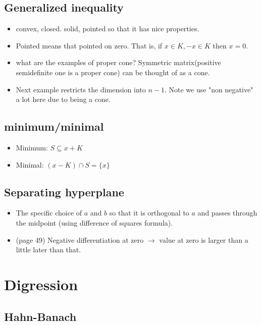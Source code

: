 \documentclass{article}
\theoremstyle{remark}
\begin{document}
\subsection*{Generalized inequality}
\begin{itemize}
\item convex, closed. solid, pointed so that it has nice properties.
    \item Pointed means that pointed on zero. That is, if $x\in K,-x\in K$ then $x=0$. 
    \item what are the examples of proper cone?
    Symmetric matrix(positive semidefinite one is a proper cone) can be thought of as a cone.
    \item Next example restricts the dimension into $n-1$. Note we use "non negative" a lot here due to being a cone.
\end{itemize}
\subsection*{minimum/minimal}
\begin{itemize}
    \item Minimum: $S\subseteq x+K$
    \item Minimal: $(x-K)\cap S=\{x\}$
\end{itemize}
\subsection*{Separating hyperplane}
\begin{itemize}
    \item The specific choice of $a$ and $b$ so that it is orthogonal to $a$ and passes through the midpoint (using difference of squares formula).
    \item (page 49) Negative differentiation at zero $\to$ value at zero is larger than a little later than that.
\end{itemize}
\newpage
\section*{Digression}
\subsection*{Hahn-Banach}
\end{document}

